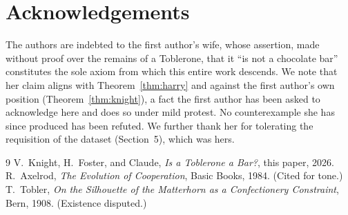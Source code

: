 \documentclass[11pt]{article}
\theoremstyle{plain}
\theoremstyle{definition}
\theoremstyle{remark}
\begin{document}
\section*{Acknowledgements}

The authors are indebted to the first author's wife, whose assertion, made
without proof over the remains of a Toblerone, that it ``is not a chocolate
bar'' constitutes the sole axiom from which this entire work descends. We
note that her claim aligns with Theorem~\ref{thm:harry} and against the
first author's own position (Theorem~\ref{thm:knight}), a fact the first
author has been asked to acknowledge here and does so under mild protest. No
counterexample she has since produced has been refuted. We further thank her
for tolerating the requisition of the dataset (Section~5), which was hers.

\begin{thebibliography}{9}
 V.~Knight, H.~Foster, and Claude, \emph{Is a Toblerone
a Bar?}, this paper, 2026.
 R.~Axelrod, \emph{The Evolution of Cooperation}, Basic
Books, 1984. (Cited for tone.)
 T.~Tobler, \emph{On the Silhouette of the Matterhorn
as a Confectionery Constraint}, Bern, 1908. (Existence disputed.)
\end{thebibliography}
\end{document}
